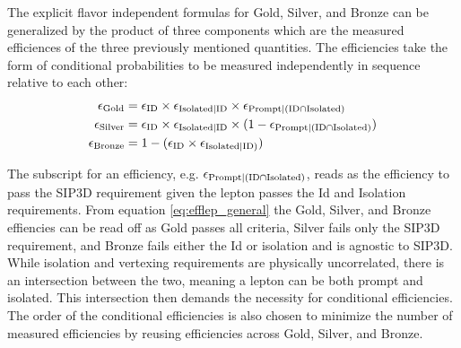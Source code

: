 The explicit flavor independent formulas for Gold, Silver, and Bronze can be generalized by the product of three components which are the measured efficiences of the three previously mentioned quantities. The efficiencies take the form of conditional probabilities to be measured independently in sequence relative to each other:
\begin{equation}\label{eq:efflep_general}
\begin{split}
\epsilon_{\text{Gold}}& = \epsilon_{\text{ID}}\times \epsilon_{\text{Isolated}|\text{ID}} \times \epsilon_{\text{Prompt}|(\text{ID} \cap \text{Isolated})} \\
\epsilon_{\text{Silver}}& = \epsilon_{\text{ID}} \times \epsilon_{\text{Isolated}|\text{ID}} \times (1-\epsilon_{\text{Prompt}|(\text{ID} \cap \text{Isolated})}) \\
\epsilon_{\text{Bronze}}& = 1-(\epsilon_{\text{ID}} \times \epsilon_{\text{Isolated}|\text{ID})} )
\end{split}
\end{equation}

The subscript for an efficiency, e.g. $\epsilon_{\text{Prompt}|(\text{ID} \cap \text{Isolated})}$, reads as the efficiency to pass the SIP3D requirement given the lepton passes the Id and Isolation requirements. From equation \ref{eq:efflep_general} the Gold, Silver, and Bronze effiencies can be read off as Gold passes all criteria, Silver fails only the SIP3D requirement, and Bronze fails either the Id or isolation and is agnostic to SIP3D. While isolation and vertexing requirements are physically uncorrelated, there is an intersection between the two, meaning a lepton can be both prompt and isolated. This intersection then demands the necessity for conditional efficiencies.  The order of the conditional efficiencies is also chosen to minimize the number of measured efficiencies by reusing efficiencies across Gold, Silver, and Bronze.  





